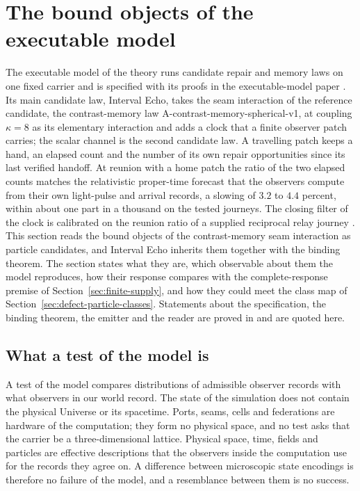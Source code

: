 \section{The bound objects of the executable model}
\label{sec:cms-objects}

The executable model of the theory runs candidate repair and memory laws on one fixed
carrier and is specified with its proofs in the executable-model paper \cite{ophmodel}.
Its main candidate law, Interval Echo, takes the seam interaction of the reference
candidate, the contrast-memory law A-contrast-memory-spherical-v1, at coupling $\kappa=8$
as its elementary interaction and adds a clock that a finite observer patch carries; the
scalar channel is the second candidate law. A travelling patch keeps a hand, an elapsed
count and the number of its own repair opportunities since its last verified handoff. At
reunion with a home patch the ratio of the two elapsed counts matches the relativistic
proper-time forecast that the observers compute from their own light-pulse and arrival
records, a slowing of $3.2$ to $4.4$ percent, within about one part in a thousand on the
tested journeys. The closing filter of the clock is calibrated on the reunion ratio of a
supplied reciprocal relay journey \cite{ophmodel}. This section reads the bound objects of
the contrast-memory seam interaction as particle candidates, and Interval Echo inherits
them together with the binding theorem. The section states what they are, which
observable about them the model reproduces, how their response compares with the
complete-response premise of Section~\ref{sec:finite-supply}, and how they could meet the
class map of Section~\ref{sec:defect-particle-classes}. Statements about the
specification, the binding theorem, the emitter and the reader are proved in
\cite{ophmodel} and are quoted here.

\subsection{What a test of the model is}
\label{sec:cms-test}

A test of the model compares distributions of admissible observer records with what
observers in our world record. The state of the simulation does not contain the physical
Universe or its spacetime. Ports, seams, cells and federations are hardware of the
computation; they form no physical space, and no test asks that the carrier be a
three-dimensional lattice. Physical space, time, fields and particles are effective
descriptions that the observers inside the computation use for the records they agree
on. A difference between microscopic state encodings is therefore no failure of the
model, and a resemblance between them is no success.

